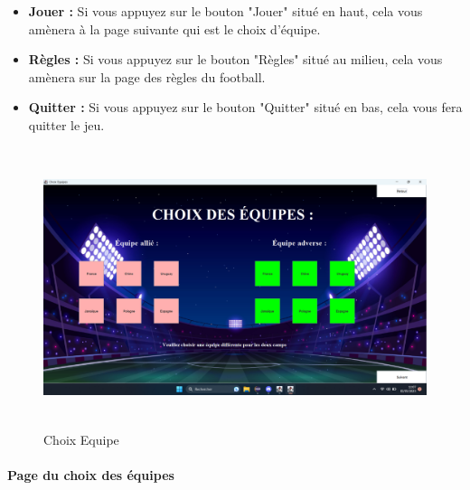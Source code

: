 \begin{itemize}
    \item \textbf{Jouer :} 
        Si vous appuyez sur le bouton "Jouer" situé en haut, cela vous amènera à la page suivante qui est le choix d'équipe.

    \vspace{15pt}

    \item \textbf{Règles :} 
        Si vous appuyez sur le bouton "Règles" situé au milieu, cela vous amènera sur la page des règles du football.

    \vspace{15pt}

    \item \textbf{Quitter :} 
        Si vous appuyez sur le bouton "Quitter" situé en bas, cela vous fera quitter le jeu.
        
    \vspace{15pt}
\end{itemize}

\newpage

\begin{figure}[h]
\centering
\includegraphics[width=12.82cm, height=8.2cm]{images/ChoixEquipe.png}
\caption{Choix Equipe}
\label{fig:choixEquipe}
\end{figure}

\paragraph{Page du choix des équipes}

